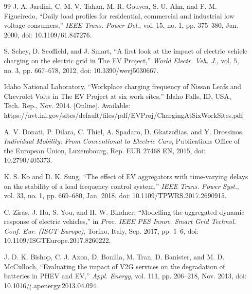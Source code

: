 \begin{thebibliography}{99}
J. A. Jardini, C. M. V. Tahan, M. R. Gouvea, S. U. Ahn, and F. M. Figueiredo,
``Daily load profiles for residential, commercial and industrial low voltage
consumers,''
\emph{IEEE Trans. Power Del.}, vol. 15, no. 1, pp. 375--380, Jan. 2000,
doi: 10.1109/61.847276.

S. Schey, D. Scoffield, and J. Smart,
``A first look at the impact of electric vehicle charging on the electric grid
in The EV Project,''
\emph{World Electr. Veh. J.}, vol. 5, no. 3, pp. 667--678, 2012,
doi: 10.3390/wevj5030667.

Idaho National Laboratory,
``Workplace charging frequency of Nissan Leafs and Chevrolet Volts in The EV
Project at six work sites,''
Idaho Falls, ID, USA, Tech. Rep., Nov. 2014. [Online]. Available:
https://avt.inl.gov/sites/default/files/pdf/EVProj/ChargingAtSixWorkSites.pdf

A. V. Donati, P. Dilara, C. Thiel, A. Spadaro, D. Gkatzoflias, and Y. Drossinos,
\emph{Individual Mobility: From Conventional to Electric Cars},
Publications Office of the European Union, Luxembourg, Rep. EUR 27468 EN,
2015, doi: 10.2790/405373.

K. S. Ko and D. K. Sung,
``The effect of EV aggregators with time-varying delays on the stability of a
load frequency control system,''
\emph{IEEE Trans. Power Syst.}, vol. 33, no. 1, pp. 669--680, Jan. 2018,
doi: 10.1109/TPWRS.2017.2690915.

C. Ziras, J. Hu, S. You, and H. W. Bindner,
``Modelling the aggregated dynamic response of electric vehicles,''
in \emph{Proc. IEEE PES Innov. Smart Grid Technol. Conf. Eur. (ISGT-Europe)},
Torino, Italy, Sep. 2017, pp. 1--6, doi: 10.1109/ISGTEurope.2017.8260222.

J. D. K. Bishop, C. J. Axon, D. Bonilla, M. Tran, D. Banister, and M. D. McCulloch,
``Evaluating the impact of V2G services on the degradation of batteries in PHEV
and EV,''
\emph{Appl. Energy}, vol. 111, pp. 206--218, Nov. 2013,
doi: 10.1016/j.apenergy.2013.04.094.

\end{thebibliography}
